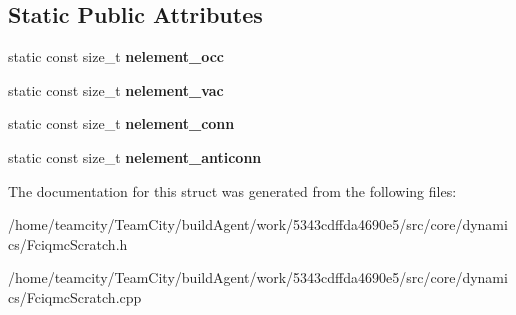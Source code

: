\subsection*{Static Public Attributes}
\begin{DoxyCompactItemize}
\item 
static const size\+\_\+t {\bfseries nelement\+\_\+occ}\hypertarget{structFciqmcScratch_a497d061a3f951b688637677c265c5e58}{}\label{structFciqmcScratch_a497d061a3f951b688637677c265c5e58}

\item 
static const size\+\_\+t {\bfseries nelement\+\_\+vac}\hypertarget{structFciqmcScratch_ae2441aed8db6d73b4f978b8730b8ed7c}{}\label{structFciqmcScratch_ae2441aed8db6d73b4f978b8730b8ed7c}

\item 
static const size\+\_\+t {\bfseries nelement\+\_\+conn}\hypertarget{structFciqmcScratch_a9a2f23390205ff070902f000dd9638cb}{}\label{structFciqmcScratch_a9a2f23390205ff070902f000dd9638cb}

\item 
static const size\+\_\+t {\bfseries nelement\+\_\+anticonn}\hypertarget{structFciqmcScratch_ac9ffa7a9991408c31c09c25fb6b5a4eb}{}\label{structFciqmcScratch_ac9ffa7a9991408c31c09c25fb6b5a4eb}

\end{DoxyCompactItemize}


The documentation for this struct was generated from the following files\+:\begin{DoxyCompactItemize}
\item 
/home/teamcity/\+Team\+City/build\+Agent/work/5343cdffda4690e5/src/core/dynamics/Fciqmc\+Scratch.\+h\item 
/home/teamcity/\+Team\+City/build\+Agent/work/5343cdffda4690e5/src/core/dynamics/Fciqmc\+Scratch.\+cpp\end{DoxyCompactItemize}
